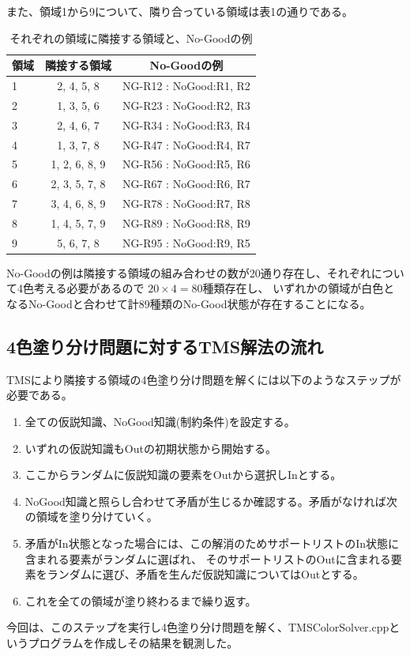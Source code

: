 \documentclass[uplatex]{jsarticle}
\begin{document}
また、領域1から9について、隣り合っている領域は表1の通りである。
\begin{table}[htb]
  \begin{center}
    \caption{それぞれの領域に隣接する領域と、No-Goodの例}
  \begin{tabular}{|l|c|c|} \hline
    領域 & 隣接する領域 & No-Goodの例\\ \hline\hline
    1 & 2, 4, 5, 8 & NG-R12 : {NoGood:{R1, R2}} \\
    2 & 1, 3, 5, 6 & NG-R23 : {NoGood:{R2, R3}} \\
    3 & 2, 4, 6, 7 & NG-R34 : {NoGood:{R3, R4}}\\
    4 & 1, 3, 7, 8 & NG-R47 : {NoGood:{R4, R7}} \\
    5 & 1, 2, 6, 8, 9 & NG-R56 : {NoGood:{R5, R6}} \\
    6 & 2, 3, 5, 7, 8 & NG-R67 : {NoGood:{R6, R7}} \\
    7 & 3, 4, 6, 8, 9 & NG-R78 : {NoGood:{R7, R8}} \\
    8 & 1, 4, 5, 7, 9 & NG-R89 : {NoGood:{R8, R9}} \\
    9 & 5, 6, 7, 8 & NG-R95 : {NoGood:{R9, R5}} \\ \hline
  \end{tabular}
\end{center}
\end{table}
No-Goodの例は隣接する領域の組み合わせの数が20通り存在し、それぞれについて4色考える必要があるので $20 \times 4= 80$種類存在し、
いずれかの領域が白色となるNo-Goodと合わせて計89種類のNo-Good状態が存在することになる。

\subsection{4色塗り分け問題に対するTMS解法の流れ}
TMSにより隣接する領域の4色塗り分け問題を解くには以下のようなステップが必要である。
\begin{enumerate}
 \item 全ての仮説知識、NoGood知識(制約条件)を設定する。
 \item いずれの仮説知識もOutの初期状態から開始する。
 \item ここからランダムに仮説知識の要素をOutから選択しInとする。
 \item NoGood知識と照らし合わせて矛盾が生じるか確認する。矛盾がなければ次の領域を塗り分けていく。
 \item 矛盾がIn状態となった場合には、この解消のためサポートリストのIn状態に含まれる要素がランダムに選ばれ、
 そのサポートリストのOutに含まれる要素をランダムに選び、矛盾を生んだ仮説知識についてはOutとする。
 \item これを全ての領域が塗り終わるまで繰り返す。
 \end{enumerate}
今回は、このステップを実行し4色塗り分け問題を解く、TMSColorSolver.cppというプログラムを作成しその結果を観測した。
\end{document}
